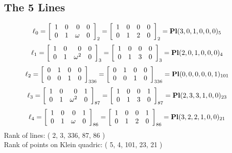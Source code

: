 \documentclass{article}
\begin{document}
{\subsection*{The 5 Lines}
$$
\ell_{0} = 
\left[
\begin{array}{*{4}{r}}
1 & 0 & 0 & 0\\
0 & 1 & \omega  & 0\\
\end{array}
\right]
_{2}
=
\left[
\begin{array}{*{4}c}
1  & 0  & 0  & 0\\
0  & 1  & 2  & 0\\
\end{array}
\right]_{2}
={\rm\bf Pl}(3,0,1,0,0,0 )_{5}$$
$$
\ell_{1} = 
\left[
\begin{array}{*{4}{r}}
1 & 0 & 0 & 0\\
0 & 1 & \omega^{2} & 0\\
\end{array}
\right]
_{3}
=
\left[
\begin{array}{*{4}c}
1  & 0  & 0  & 0\\
0  & 1  & 3  & 0\\
\end{array}
\right]_{3}
={\rm\bf Pl}(2,0,1,0,0,0 )_{4}$$
$$
\ell_{2} = 
\left[
\begin{array}{*{4}{r}}
0 & 1 & 0 & 0\\
0 & 0 & 1 & 0\\
\end{array}
\right]
_{336}
=
\left[
\begin{array}{*{4}c}
0  & 1  & 0  & 0\\
0  & 0  & 1  & 0\\
\end{array}
\right]_{336}
={\rm\bf Pl}(0,0,0,0,0,1 )_{101}$$
$$
\ell_{3} = 
\left[
\begin{array}{*{4}{r}}
1 & 0 & 0 & 1\\
0 & 1 & \omega^{2} & 0\\
\end{array}
\right]
_{87}
=
\left[
\begin{array}{*{4}c}
1  & 0  & 0  & 1\\
0  & 1  & 3  & 0\\
\end{array}
\right]_{87}
={\rm\bf Pl}(2,3,3,1,0,0 )_{23}$$
$$
\ell_{4} = 
\left[
\begin{array}{*{4}{r}}
1 & 0 & 0 & 1\\
0 & 1 & \omega  & 0\\
\end{array}
\right]
_{86}
=
\left[
\begin{array}{*{4}c}
1  & 0  & 0  & 1\\
0  & 1  & 2  & 0\\
\end{array}
\right]_{86}
={\rm\bf Pl}(3,2,2,1,0,0 )_{21}$$
Rank of lines: ( 2, 3, 336, 87, 86 )\\
Rank of points on Klein quadric: ( 5, 4, 101, 23, 21 )\\
}
\end{document}
